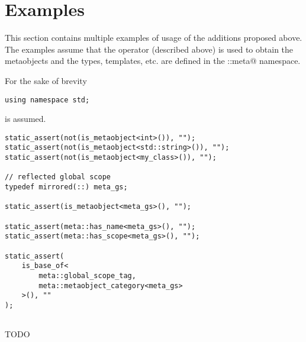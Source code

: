 \section{Examples}

This section contains multiple examples of usage of the additions proposed above.
The examples assume that the \verb@mirrored@ operator (described above) is used
to obtain the metaobjects and the types, templates, etc. are defined in the
\verb@std::meta@ namespace.

For the sake of brevity

\begin{verbatim}
using namespace std;
\end{verbatim}

is assumed.

\begin{verbatim}
static_assert(not(is_metaobject<int>()), "");
static_assert(not(is_metaobject<std::string>()), "");
static_assert(not(is_metaobject<my_class>()), "");

// reflected global scope
typedef mirrored(::) meta_gs;

static_assert(is_metaobject<meta_gs>(), "");

static_assert(meta::has_name<meta_gs>(), "");
static_assert(meta::has_scope<meta_gs>(), "");

static_assert(
	is_base_of<
		meta::global_scope_tag,
		meta::metaobject_category<meta_gs>
	>(), ""
);


\end{verbatim}

TODO


